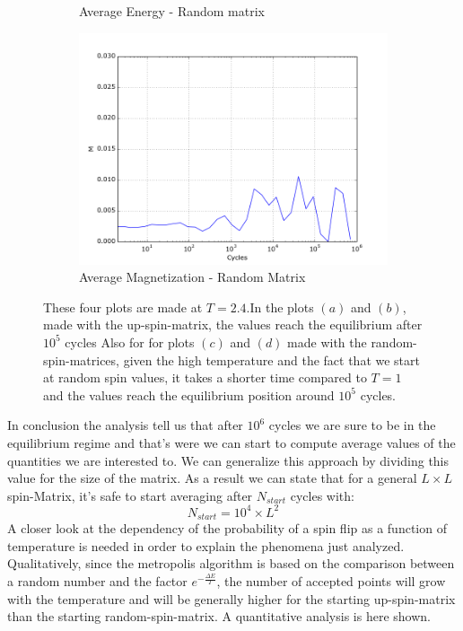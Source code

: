 \documentclass[10pt,a4paper,titlepage]{article}
\begin{document}
\begin{figure}[H]
\begin{subfigure}{.42\textwidth}
  \caption{{\footnotesize Average Energy - Random matrix}}
  \label{fig:sfig2}
\end{subfigure}
\begin{subfigure}{.42\textwidth}
  \centering
  \includegraphics[width=.8\linewidth]{MAGNETIZATION_T2_RAND_10000MEAN}
  \caption{{\footnotesize Average Magnetization - Random Matrix}}
  \label{fig:sfig2}
\end{subfigure}
\caption{{\footnotesize These four plots are made at $T=2.4$.In the plots $(a)$ and $(b)$, made with the up-spin-matrix, the values reach the equilibrium after $10^5$ cycles Also for for plots  $(c)$ and $(d)$ made with the random-spin-matrices, given the high temperature and the fact that we start at random spin values, it takes a shorter time compared to $T=1$ and the values reach the equilibrium position around $10^5$ cycles.}}
\label{fig:fig}
\end{figure}
\noindent In conclusion the analysis tell us that after $10^6$ cycles we are sure to be in the equilibrium regime and that's were we can start to compute average values of the quantities we are interested to. We can generalize this approach by dividing this value for the size of the matrix.
As a result we can state that for a general $L\times L$ spin-Matrix, it's safe to start averaging after $N_{start}$ cycles with:
\begin{equation}
N_{start}=10^4\times L^2
\end{equation}
\noindent A closer look at the dependency of the probability of a spin flip as a function of temperature is needed in order to explain the phenomena just analyzed. Qualitatively, since the metropolis algorithm is based on the comparison between a random number and the factor $e^{- \frac{\Delta E}{T}}$, the number of accepted points will grow with the temperature and will be generally higher for the starting up-spin-matrix than the starting random-spin-matrix. A quantitative analysis is here shown.  \\ 
\end{document}
